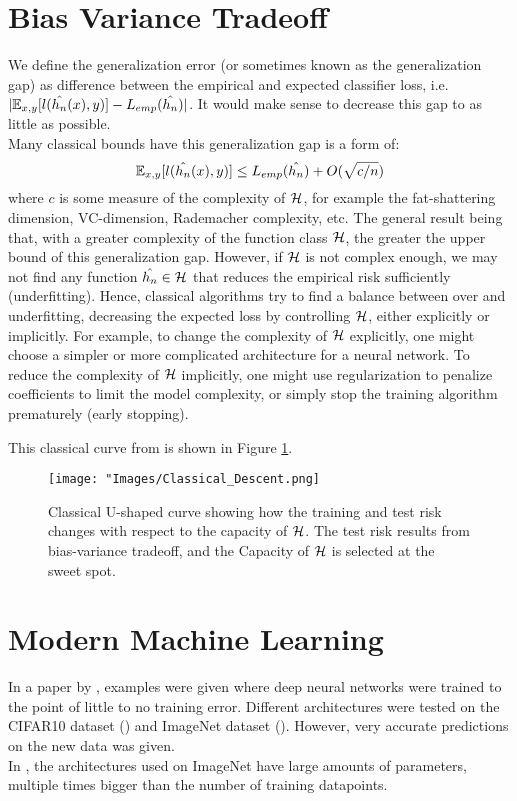 \documentclass[twoside]{memoir}
\begin{document}
\section{Bias Variance Tradeoff}
We define the generalization error (or sometimes known as the generalization gap) as difference between the empirical and expected classifier loss, i.e. $ \lvert \mathbb{E}_{x,y}[l(\hat{h_n}(x), y)] - L_{emp}(\hat{h_n}) \rvert $. It would make sense to decrease this gap to as little as possible.\\
Many classical bounds have this generalization gap is a form of:
\begin{equation} \label{eqn:Generalization_Gap}
\mathbb{E}_{x,y}[l(\hat{h_n}(x), y)] \leq L_{emp}(\hat{h_n}) + O(\sqrt{c/n})
\end{equation}
where $c$ is some  measure of the complexity of $\mathcal{H}$, for example the fat-shattering dimension, VC-dimension, Rademacher complexity, etc. The general result being that, with a greater complexity of the function class $\mathcal{H}$, the greater the upper bound of this generalization gap. However, if $\mathcal{H}$ is not complex enough, we may not find any function $\hat{h_n} \in \mathcal{H}$ that reduces the empirical risk sufficiently (underfitting). Hence, classical algorithms try to find a balance between over and underfitting, decreasing the expected loss by controlling $\mathcal{H}$, either explicitly or implicitly.
For example, to change the complexity of $\mathcal{H}$ explicitly, one might choose a simpler or more complicated architecture for a neural network. To reduce the complexity of $\mathcal{H}$ implicitly, one might use regularization to  penalize coefficients to limit the model complexity, or simply stop the training algorithm prematurely (early stopping).

This classical curve from \cite{Belkin_2019} is shown in Figure \ref{fig:Classical_Descent}.
\begin{figure}
	\centering
	\texttt{[image: "Images/Classical\_Descent.png]}
	\par
	\caption{Classical U-shaped curve showing how the training and test risk changes with respect to the capacity of $\mathcal{H}$. The test risk results from bias-variance tradeoff, and the Capacity of $\mathcal{H}$ is selected at the sweet spot.} \label{fig:Classical_Descent}
\end{figure}

\section{Modern Machine Learning}
In a paper by \cite{Zhang_Deep_Learning}, examples were given where  deep neural networks were trained to the point of little to no training error. Different architectures were tested on the CIFAR10 dataset (\cite{krizhevsky2009learning}) and ImageNet dataset (\cite{Russakovsky_2015}). However, very accurate predictions on the new data was given.\\
In \cite{Alfredo2016}, the architectures used on ImageNet have large amounts of parameters, multiple times bigger than the number of training datapoints.
\end{document}
